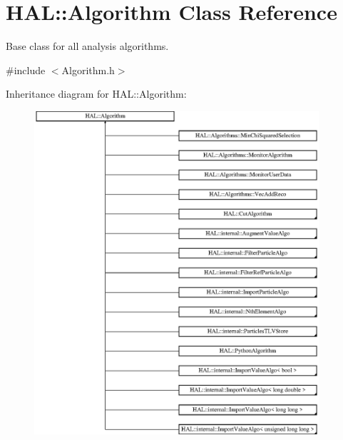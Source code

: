 \hypertarget{class_h_a_l_1_1_algorithm}{\section{H\+A\+L\+:\+:Algorithm Class Reference}
\label{class_h_a_l_1_1_algorithm}
}


Base class for all analysis algorithms.  




{\ttfamily \#include $<$Algorithm.\+h$>$}

Inheritance diagram for H\+A\+L\+:\+:Algorithm\+:\begin{figure}[H]
\begin{center}
\leavevmode
\includegraphics[height=12.000000cm]{class_h_a_l_1_1_algorithm}
\end{center}
\end{figure}
